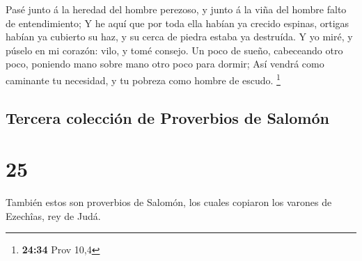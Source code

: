  Pasé junto á la heredad del hombre perezoso, y junto á la
viña del hombre falto de entendimiento;  Y he aquí que por
toda ella habían ya crecido espinas, ortigas habían ya cubierto su haz,
y su cerca de piedra estaba ya destruída.  Y yo miré, y
púselo en mi corazón: vilo, y tomé consejo.  Un poco de
sueño, cabeceando otro poco, poniendo mano sobre mano otro poco para
dormir;  Así vendrá como caminante tu necesidad, y tu
pobreza como hombre de escudo. \footnote{\textbf{24:34} Prov 10,4}

\hypertarget{tercera-colecciuxf3n-de-proverbios-de-salomuxf3n}{%
\subsection{Tercera colección de Proverbios de
Salomón}\label{tercera-colecciuxf3n-de-proverbios-de-salomuxf3n}}

\hypertarget{section-24}{%
\section{25}\label{section-24}}

 También estos son proverbios de Salomón, los cuales
copiaron los varones de Ezechîas, rey de Judá.

